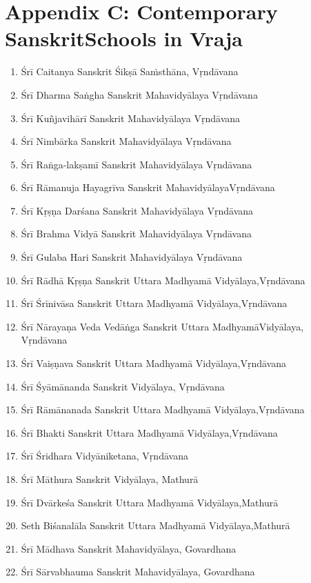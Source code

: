 \section*{Appendix C: Contemporary Sanskrit\hfill\break Schools in Vraja}
\begin{enumerate}
\itemsep=0pt
\item Śrī Caitanya Sanskrit Śikṣā Saṁsthāna, Vṛndāvana 
\item Śrī Dharma Saṅgha Sanskrit Mahavidyālaya Vṛndāvana 
\item Śrī Kuñjavihārī Sanskrit Mahavidyālaya Vṛndāvana 
\item Śrī Nimbārka Sanskrit Mahavidyālaya Vṛndāvana 
\item Śrī Raṅga-lakṣamī Sanskrit Mahavidyālaya Vṛndāvana 
\item Śrī Rāmanuja Hayagrīva Sanskrit Mahavidyālaya\hfil\break Vṛndāvana 
\item Śrī Kṛṣṇa Darśana Sanskrit Mahavidyālaya Vṛndāvana 
\item Śrī Brahma Vidyā Sanskrit Mahavidyālaya Vṛndāvana 
\item Śrī Gulaba Hari Sanskrit Mahavidyālaya Vṛndāvana 
\item Śrī Rādhā Kṛṣṇa Sanskrit Uttara Madhyamā Vidyālaya,\hfil\break Vṛndāvana 
\item Śrī Śrīnivāsa Sanskrit Uttara Madhyamā Vidyālaya,\hfil\break Vṛndāvana 
\item Śrī Nārayaṇa Veda Vedāṅga Sanskrit Uttara Madhyamā\hfil\break Vidyālaya, Vṛndāvana 
\item Śrī Vaiṣṇava Sanskrit Uttara Madhyamā Vidyālaya,\hfil\break Vṛndāvana 
\item Śrī Śyāmānanda Sanskrit Vidyālaya, Vṛndāvana 
\item Śrī Rāmānanada Sanskrit Uttara Madhyamā Vidyālaya,\hfil\break Vṛndāvana 
\item Śrī Bhakti Sanskrit Uttara Madhyamā Vidyālaya,\hfil\break Vṛndāvana 
\item Śrī Śridhara Vidyāniketana, Vṛndāvana 
\item Śrī Māthura Sanskrit Vidyālaya, Mathurā 
\item Śrī Dvārkeśa Sanskrit Uttara Madhyamā Vidyālaya,\hfil\break Mathurā 
\item Seth Biśanalāla Sanskrit Uttara Madhyamā Vidyālaya,\hfil\break Mathurā 
\item Śrī Mādhava Sanskrit Mahavidyālaya, Govardhana 
\item Śrī Sārvabhauma Sanskrit Mahavidyālaya, Govardhana 

\end{enumerate}
